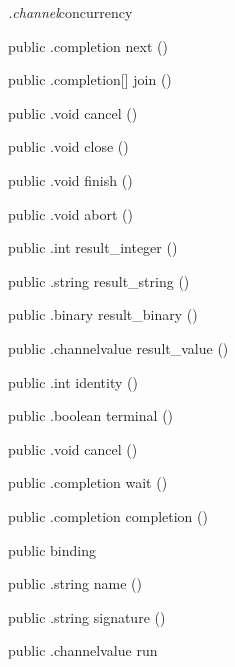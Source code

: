 \begin{CrexxClass}{\textit{.channel}}{concurrency}
\begin{Members}
    \Method
      {public}
      {.completion}
      {next}
      {()}

    \Method
      {public}
      {.completion[]}
      {join}
      {()}

    \Method
      {public}
      {.void}
      {cancel}
      {()}

    \Method
      {public}
      {.void}
      {close}
      {()}

    \Method
      {public}
      {.void}
      {finish}
      {()}

    \Method
      {public}
      {.void}
      {abort}
      {()}

    \Method
      {public}
      {.int}
      {result\_integer}
      {()}

    \Method
      {public}
      {.string}
      {result\_string}
      {()}

    \Method
      {public}
      {.binary}
      {result\_binary}
      {()}

    \Method
      {public}
      {.channelvalue}
      {result\_value}
      {()}

    \Method
      {public}
      {.int}
      {identity}
      {()}

    \Method
      {public}
      {.boolean}
      {terminal}
      {()}

    \Method
      {public}
      {.void}
      {cancel}
      {()}

    \Method
      {public}
      {.completion}
      {wait}
      {()}

    \Method
      {public}
      {.completion}
      {completion}
      {()}

    \Factory
      {public}
      {binding}
      {}

    \Method
      {public}
      {.string}
      {name}
      {()}

    \Method
      {public}
      {.string}
      {signature}
      {()}

    \Method
      {public}
      {.channelvalue}
      {run}
      {}


\end{Members}
\end{CrexxClass}
